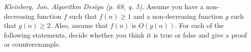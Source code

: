 \documentclass[solutionorbox, answers]{exam}
\begin{document}
\begin{questions}

\pagebreak

  \question \textit{Kleinberg, Jon. Algorithm Design (p. 68, q. 5).} Assume you have a non-decreasing function $f$ such that $f(n) \ge 1$ and a non-decreasing function $g$ such that $g(n) \geq 2$. Also, assume that $f(n)$ is $O(g(n))$. For each of the following statements, decide whether you think it is true or false and give a proof or counterexample.

\end{questions}
\end{document}
